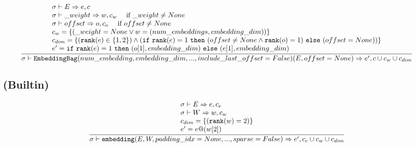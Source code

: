 \documentclass{article}
\begin{document}
\begin{align*}
  \frac
  {
    \begin{array}{l}
      \sigma \vdash E \Rightarrow e, c \\
      \sigma \vdash \_weight \Rightarrow w, c_w \,\,\,\,\,\,\,\,\text{if $\_weight \neq None$} \\
      \sigma \vdash offset \Rightarrow o, c_o \,\,\,\,\,\,\,\, \text{if $offset \neq None$} \\
      c_w = \{ (\_weight = None \lor w = (num\_embeddings, embedding\_dim)) \} \\
      c_{dim} = \{ (\mathtt{rank(}e\mathtt{)} \in \{1,2\}) \land
        (\mathtt{if}\,\,\mathtt{rank(}e\mathtt{)} = 1\,\,\mathtt{then}\,\,(offset \neq None \land \mathtt{rank(}o\mathtt{)} = 1)\,\,\mathtt{else}\,\,(offset = None)) \} \\
      e' = \mathtt{if}\,\,\mathtt{rank(}e\mathtt{)} = 1\,\,\mathtt{then}\,\,(o[1], embedding\_dim)\,\,\mathtt{else}\,\,(e[1], embedding\_dim)
    \end{array}
  }
  {
    \sigma \vdash \mathtt{EmbeddingBag(}num\_embedding, embedding\_dim, ...,
      include\_last\_offset=False\mathtt{)(}E, offset=None\mathtt{)} \Rightarrow e', c \cup c_w \cup c_{dim}
  }
\end{align*}


\subsection*{(Builtin) }
\begin{align*}
  \frac
  {
    \begin{array}{l}
      \sigma \vdash E \Rightarrow e, c_e \\
      \sigma \vdash W \Rightarrow w, c_w \\
      c_{dim} = \{ (\mathtt{rank(}w\mathtt{)} = 2) \} \\
      e' = e \mathtt{@} (w[2])
    \end{array}
  }
  {
    \sigma \vdash \mathtt{embedding(}E, W, padding\_idx=None, ..., sparse=False\mathtt{)}
      \Rightarrow e', c_e \cup c_w \cup c_{dim}
  }
\end{align*}
\end{document}
